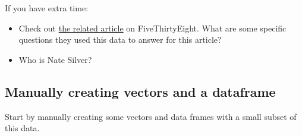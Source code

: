\documentclass[]{book}
\providecommand{\tightlist}{%
  \setlength{\itemsep}{0pt}\setlength{\parskip}{0pt}}
\theoremstyle{definition}
\theoremstyle{definition}
\theoremstyle{definition}
\theoremstyle{remark}
\begin{document}
If you have extra time:

\begin{itemize}
\tightlist
\item
  Check out
  \href{http://fivethirtyeight.com/datalab/every-guest-jon-stewart-ever-had-on-the-daily-show/}{the
  related article} on FiveThirtyEight. What are some specific questions
  they used this data to answer for this article?
\item
  Who is Nate Silver?
\end{itemize}

\subsection{Manually creating vectors and a
dataframe}\label{manually-creating-vectors-and-a-dataframe}

Start by manually creating some vectors and data frames with a small
subset of this data.
\end{document}
